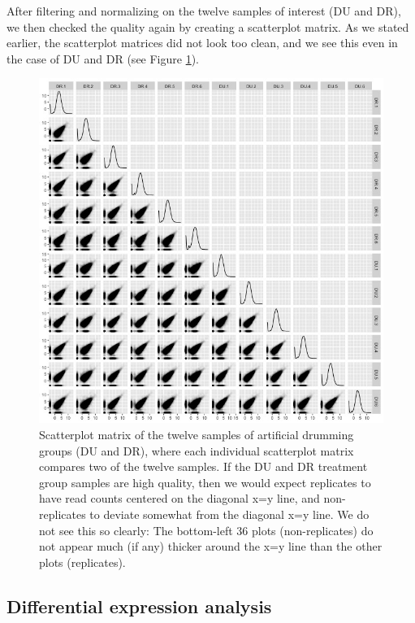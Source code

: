 \documentclass[11pt,a4paper,oldfontcommands,openany]{memoir}
\numberwithin{equation}{section} %
\begin{document}
After filtering and normalizing on the twelve samples of interest (DU and DR), we then checked the quality again by creating a scatterplot matrix. As we stated earlier, the scatterplot matrices did not look too clean, and we see this even in the case of DU and DR (see Figure \ref{fig:scatMatPW}).

\begin{figure}[H]
    \begin{framed}
    \centering
    \includegraphics[width=\textwidth]{scatMatPW}
    \end{framed}
    \caption{Scatterplot matrix of the twelve samples of artificial drumming groups (DU and DR), where each individual scatterplot matrix compares two of the twelve samples. If the DU and DR treatment group samples are high quality, then we would expect replicates to have read counts centered on the diagonal x=y line, and non-replicates to deviate somewhat from the diagonal x=y line. We do not see this so clearly: The bottom-left 36 plots (non-replicates) do not appear much (if any) thicker around the x=y line than the other plots (replicates).}
    \label{fig:scatMatPW}
\end{figure}

\subsection{Differential expression analysis}
\end{document}

